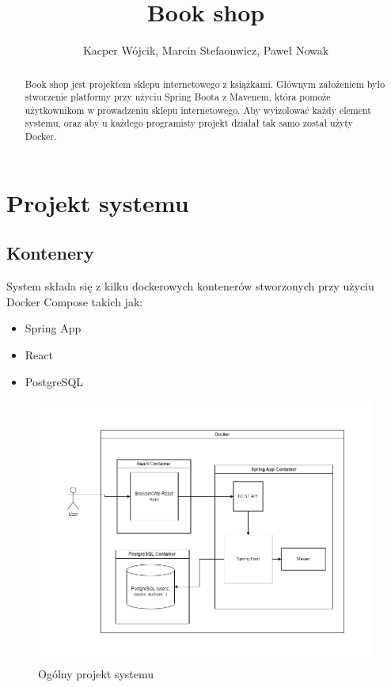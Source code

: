 \documentclass[]{article}
\title{Book shop}
\author{Kacper Wójcik, Marcin Stefaonwicz, Paweł Nowak}
\begin{document}
\maketitle

\begin{abstract}
	Book shop jest projektem sklepu internetowego z książkami. Głównym założeniem było stworzenie platformy przy użyciu Spring Boota z Mavenem, która pomoże użytkownikom w prowadzeniu sklepu internetowego. Aby wyizolować każdy element systemu, oraz aby u każdego programisty projekt działał tak samo został użyty Docker.

\end{abstract}
\newpage

\section{Projekt systemu}
\subsection{Kontenery}
System składa się z kilku dockerowych kontenerów stworzonych przy użyciu Docker Compose takich jak:
\begin{itemize}
	\item Spring App
	\item React
	\item PostgreSQL
\end{itemize}
\begin{figure}[h]
	\centering
	\includegraphics[scale=0.45]{ogolny_projekt.png}
	\caption{Ogólny projekt systemu}
\end{figure}
\end{document}

